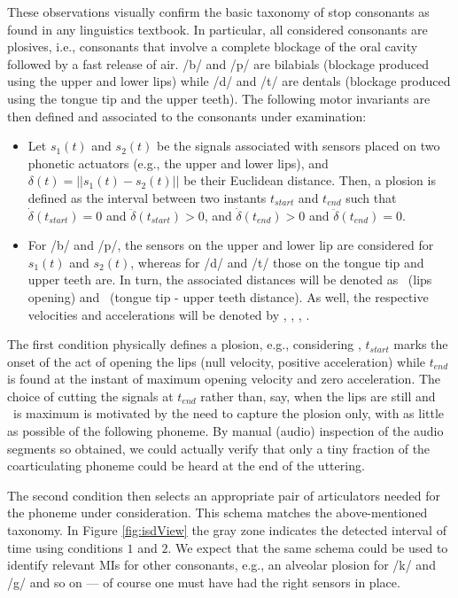 These observations visually confirm the basic taxonomy of stop consonants 
as found in any linguistics textbook. In particular, all considered consonants are plosives,
i.e., consonants that involve a complete blockage of the oral cavity followed by a fast
release of air. /b/ and /p/ are bilabials (blockage produced using the upper and lower lips)
while /d/ and /t/ are dentals (blockage produced using the tongue tip and the upper teeth).
The following motor invariants are then defined and associated to the consonants under
examination:

\begin{itemize}

  \item Let $s_1(t)$ and $s_2(t)$ be the signals associated
    with sensors placed on two phonetic actuators (e.g., the upper and
    lower lips), and $\delta(t) = ||s_1(t)-s_2(t)||$ be their
    Euclidean distance. Then, a plosion is defined as the interval
    between two instants $t_{start}$ and $t_{end}$ such that
    $\dot{\delta}(t_{start}) = 0 $ and $\ddot{\delta}(t_{start}) > 0$,
    and $\dot{\delta}(t_{end}) > 0 $ and $\ddot{\delta}(t_{end}) = 0$.

  \item For /b/ and /p/, the sensors on the upper and lower
    lip are considered for $s_1(t)$ and $s_2(t)$, whereas for /d/ and /t/
    those on the tongue tip and upper teeth are. In turn, the associated
    distances will be denoted as \lio\ (lips opening) and \ttu\
    (tongue tip - upper teeth distance). As well, the respective velocities
    and accelerations will be denoted by \vlio, \vttu, \alio, \attu.

\end{itemize}

The first condition physically defines a plosion, e.g., considering \lio, $t_{start}$
marks the onset of the act of opening the lips (null velocity, positive acceleration)
while $t_{end}$ is found at the instant of maximum opening velocity and zero acceleration.
The choice of cutting the signals at $t_{end}$ rather than, say, when the lips are still
and \lio\ is maximum is motivated by the need to capture the plosion only, with as little
as possible of the following phoneme. By manual (audio) inspection of the audio segments so
obtained, we could actually verify that only a tiny fraction of the coarticulating phoneme
could be heard at the end of the uttering.

The second condition then selects an appropriate pair of articulators needed for the
phoneme under consideration. This schema matches the above-mentioned taxonomy. In Figure
\ref{fig:isdView} the gray zone indicates the detected interval of time using conditions
$1$ and $2$. We expect that the same schema could be used to identify relevant MIs for
other consonants, e.g., an alveolar plosion for /k/ and /g/ and so on --- of course one
must have had the right sensors in place.

